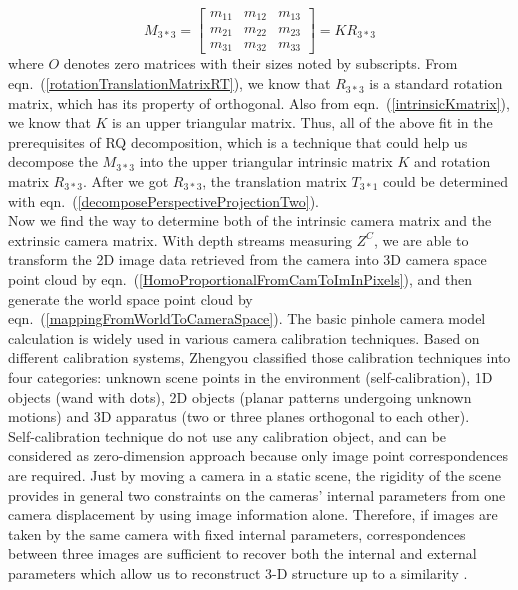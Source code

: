 \begin{equation}
M_{3*3} =
\begin{bmatrix} 
m_{11} & m_{12} & m_{13} \\
m_{21} & m_{22} & m_{23} \\
m_{31} & m_{32} & m_{33}  
\end{bmatrix}%
=
KR_{3*3}
\label{QRdecompositionEquation}
\end{equation}%
\noindent
where \(O\) denotes zero matrices with their sizes noted by subscripts. From eqn.~(\ref{rotationTranslationMatrixRT}), we know that \(R_{3*3}\) is a standard rotation matrix, which has its property of orthogonal. Also from eqn.~(\ref{intrinsicKmatrix}), we know that \(K\) is an upper triangular matrix. Thus, all of the above fit in the prerequisites of RQ decomposition, which is a technique that could help us decompose the \(M_{3*3}\) into the upper triangular intrinsic matrix \(K\) and rotation matrix \(R_{3*3}\). After we got \(R_{3*3}\), the translation matrix \(T_{3*1}\) could be determined with eqn.~(\ref{decomposePerspectiveProjectionTwo}).
\\\indent%
%
Now we find the way to determine both of the intrinsic camera matrix and the extrinsic camera matrix. With depth streams measuring \(Z^C\), we are able to transform the 2D image data retrieved from the camera into 3D camera space point cloud by eqn.~(\ref{HomoProportionalFromCamToImInPixels}), and then generate the world space point cloud by eqn.~(\ref{mappingFromWorldToCameraSpace}). The basic pinhole camera model calculation is widely used in various camera calibration techniques. Based on different calibration systems, Zhengyou \cite{Zhengyou04} classified those calibration techniques into four categories: unknown scene points in the environment (self-calibration), 1D objects (wand with dots), 2D objects (planar patterns undergoing unknown motions) and 3D apparatus (two or three planes orthogonal to each other). 
\\\indent
Self-calibration technique do not use any calibration object, and can be considered as zero-dimension approach because only image point correspondences are required. Just by moving a camera in a static scene, the rigidity of the scene provides in general two constraints \cite{selfCalibration3_1992} on the cameras' internal parameters from one camera displacement by using image information alone. Therefore, if images are taken by the same camera with fixed internal parameters, correspondences between three images are sufficient to recover both the internal and external parameters which allow us to reconstruct 3-D structure up to a similarity \cite{selfCalibration2_1997, selfCalibration1_1994}. 
